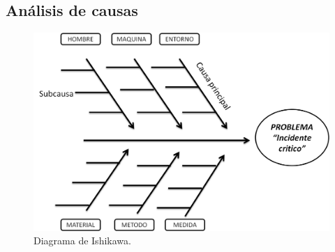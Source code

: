 \subsection{Análisis de causas}

\begin{figure}[htbp!]
		\centering
			\includegraphics[width=1\textwidth]{images/Ishikawa}
		\caption{Diagrama de Ishikawa.}
	\end{figure}
    
